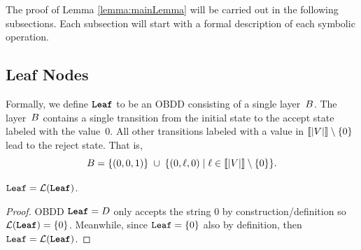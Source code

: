 The proof of Lemma \ref{lemma:mainLemma} will be carried out in the following subsections. Each subsection will start with a formal description of each symbolic operation.


\subsection{Leaf Nodes}


Formally, we define $\texttt{\textbf{Leaf}}$ to be an OBDD consisting of a single layer~$B$.
The layer~$B$ contains a single transition from the initial state to the accept
state labeled with the value~$0$. All other transitions labeled with a value in
$\llbracket |V| \rrbracket \setminus \{0\}$ lead to the reject state. That is,
\[
B
= \{(0,0,1)\}
\;\cup\;
\{(0,\ell,0) \mid \ell \in \llbracket |V| \rrbracket \setminus \{0\}\}.
\]






\begin{lemma}
\label{lemma:SymbolicLeaf}
    $\texttt{Leaf} = \mathcal{L}(\texttt{\textbf{Leaf}})$. 
\end{lemma}
\begin{proof}
    OBDD $\texttt{\textbf{Leaf}} = D$ only accepts the string $0$ by construction/definition so $\mathcal{L}(\texttt{\textbf{Leaf}}) = \{0\}$. Meanwhile, since $\texttt{Leaf} =  \{0\}$ also by definition, then $\texttt{Leaf} = \mathcal{L}(\texttt{\textbf{Leaf}})$.
\end{proof}


